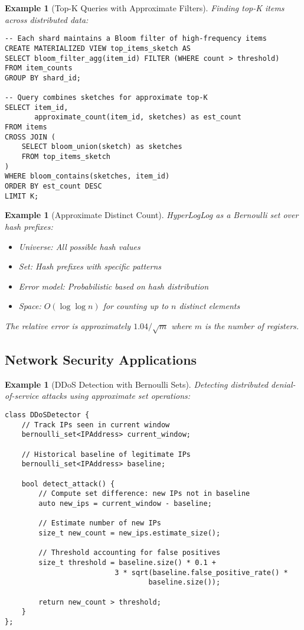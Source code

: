 \documentclass[11pt,final,hidelinks]{article}
\newtheorem{example}[theorem]{Example}
\begin{document}
\begin{example}[Top-K Queries with Approximate Filters]
Finding top-K items across distributed data:
\begin{verbatim}
-- Each shard maintains a Bloom filter of high-frequency items
CREATE MATERIALIZED VIEW top_items_sketch AS
SELECT bloom_filter_agg(item_id) FILTER (WHERE count > threshold)
FROM item_counts
GROUP BY shard_id;

-- Query combines sketches for approximate top-K
SELECT item_id, 
       approximate_count(item_id, sketches) as est_count
FROM items
CROSS JOIN (
    SELECT bloom_union(sketch) as sketches 
    FROM top_items_sketch
)
WHERE bloom_contains(sketches, item_id)
ORDER BY est_count DESC
LIMIT K;
\end{verbatim}
\end{example}

\begin{example}[Approximate Distinct Count]
HyperLogLog as a Bernoulli set over hash prefixes:
\begin{itemize}
    \item Universe: All possible hash values
    \item Set: Hash prefixes with specific patterns
    \item Error model: Probabilistic based on hash distribution
    \item Space: $O(\log \log n)$ for counting up to $n$ distinct elements
\end{itemize}

The relative error is approximately $1.04/\sqrt{m}$ where $m$ is the number of registers.
\end{example}

\subsection{Network Security Applications}

\begin{example}[DDoS Detection with Bernoulli Sets]
Detecting distributed denial-of-service attacks using approximate set operations:

\begin{verbatim}
class DDoSDetector {
    // Track IPs seen in current window
    bernoulli_set<IPAddress> current_window;
    
    // Historical baseline of legitimate IPs
    bernoulli_set<IPAddress> baseline;
    
    bool detect_attack() {
        // Compute set difference: new IPs not in baseline
        auto new_ips = current_window - baseline;
        
        // Estimate number of new IPs
        size_t new_count = new_ips.estimate_size();
        
        // Threshold accounting for false positives
        size_t threshold = baseline.size() * 0.1 + 
                          3 * sqrt(baseline.false_positive_rate() * 
                                  baseline.size());
        
        return new_count > threshold;
    }
};
\end{verbatim}
\end{example}
\end{document}
